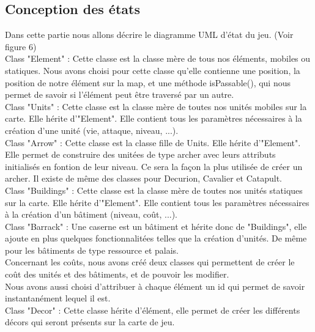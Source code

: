 \documentclass[12pt,a4paper]{article}
\begin{document}
\subsection{Conception des états}
Dans cette partie nous allons décrire le diagramme UML d'état du jeu. (Voir figure 6)\\

Class "Element" : Cette classe est la classe mère de tous nos éléments, mobiles ou statiques. Nous avons choisi pour cette classe qu'elle contienne une position, la position de notre élément sur la map, et une méthode isPassable(), qui nous permet de savoir si l'élément peut être traversé par un autre.\\

Class "Units" : Cette classe est la classe mère de toutes nos unités mobiles sur la carte. Elle hérite d'"Element". Elle contient tous les paramètres nécessaires à la création d'une unité (vie, attaque, niveau, ...). \\

Class "Arrow" : Cette classe est la classe fille de Units. Elle hérite d'"Element". Elle permet de construire des unitées de type archer avec leurs attributs initialisés en fontion de leur niveau. Ce sera la façon la plus utilisée de créer un archer. Il existe de même des classes pour Decurion, Cavalier et Catapult.\\

Class "Buildings" : Cette classe est la classe mère de toutes nos unités statiques sur la carte. Elle hérite d'"Element". Elle contient tous les paramètres nécessaires à la création d'un bâtiment (niveau, coût, ...).\\

Class "Barrack" : Une caserne est un bâtiment et hérite donc de "Buildings", elle ajoute en plus quelques fonctionnalitées telles que la création d'unités. De même pour les bâtiments de type ressource et palais.\\

Concernant les coûts, nous avons créé deux classes qui permettent de créer le coût des unités et des bâtiments, et de pouvoir les modifier.\\

Nous avons aussi choisi d'attribuer à chaque élément un id qui permet de savoir instantanément lequel il est.\\

Class "Decor" : Cette classe hérite d'élément, elle permet de créer les différents décors qui seront présents sur la carte de jeu.\\ 
\end{document}
